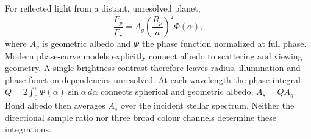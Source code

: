 For reflected light from a distant, unresolved planet,
\begin{equation}
 \frac{F_p}{F_\star}=A_g\left(\frac{R_p}{a}\right)^2\Phi(\alpha),
 \label{eq:alb-planet}
\end{equation}
where $A_g$ is geometric albedo and $\Phi$ the phase function normalized at full phase. Modern phase-curve models explicitly connect albedo to scattering and viewing geometry\cite{heng2021}. A single brightness contrast therefore leaves radius, illumination and phase-function dependencies unresolved. At each wavelength the phase integral $Q=2\int_0^\pi\Phi(\alpha)\sin\alpha\,d\alpha$ connects spherical and geometric albedo, $A_s=Q A_g$. Bond albedo then averages $A_s$ over the incident stellar spectrum. Neither the directional sample ratio nor three broad colour channels determine these integrations.

